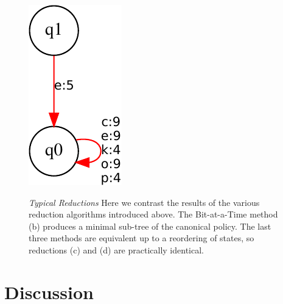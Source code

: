 \begin{figure}
{\includegraphics[scale=0.3, angle=35]{exact.pdf}
}
\caption{\emph{Typical Reductions}
Here we contrast the results of the various reduction algorithms introduced above.
The Bit-at-a-Time method (b) produces a minimal sub-tree of
the canonical policy.
The last three methods are equivalent up to a reordering of states,
so reductions (c) and (d) are practically identical. 
}
\end{figure}
\section{Discussion}

